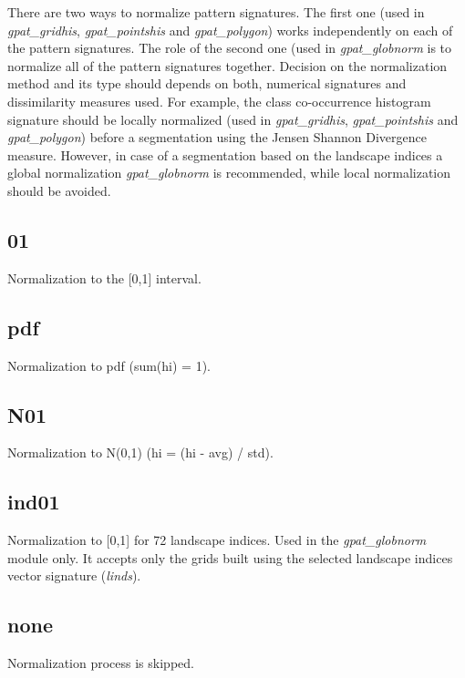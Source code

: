 There are two ways to normalize pattern signatures.
The first one (used in {\it gpat\_gridhis}, {\it gpat\_pointshis} and {\it gpat\_polygon}) works independently on each of the pattern signatures.
The role of the second one (used in {\it gpat\_globnorm} is to normalize all of the pattern signatures together. 
Decision on the normalization method and its type should depends on both, numerical signatures and dissimilarity measures used.
For example, the class co-occurrence histogram signature should be locally normalized (used in {\it gpat\_gridhis}, {\it gpat\_pointshis} and {\it gpat\_polygon}) before a segmentation using the Jensen Shannon Divergence measure.
However, in case of a segmentation based on the landscape indices a global normalization {\it gpat\_globnorm} is recommended, while local normalization should be avoided.

\subsection{01}

Normalization to the [0,1] interval.

\subsection{pdf}

Normalization to pdf (sum(hi) = 1).

\subsection{N01}

Normalization to N(0,1) (hi = (hi - avg) / std).

\subsection{ind01}

Normalization to [0,1] for 72 landscape indices.
Used in the {\it gpat\_globnorm} module only.
It accepts only the grids built using the selected landscape indices vector signature ({\it linds}).

\subsection{none}

Normalization process is skipped. 
